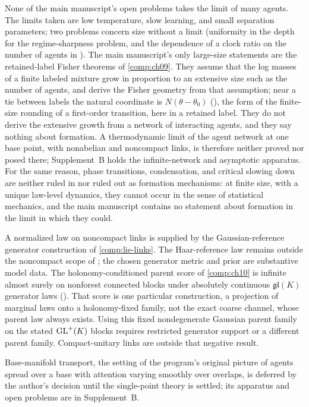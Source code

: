 None of the main manuscript's open problems takes the limit of many agents. The limits taken are low
temperature, slow learning, and small separation parameters; two problems concern size without a
limit (uniformity in the depth for the regime-sharpness problem, and the dependence of a clock ratio
on the number of agents in ). The main manuscript's only large-size
statements are the retained-label Fisher theorems of \cref{comp:ch09}. They assume that the log
masses of a finite labeled mixture grow in proportion to an extensive size such as the number of
agents, and derive the Fisher geometry from that assumption; near a tie between labels the natural
coordinate is $N(\theta-\theta_0)$ (), the form of the finite-size
rounding of a first-order transition, here in a retained label. They do not derive the extensive
growth from a network of interacting agents, and they say nothing about formation. A thermodynamic
limit of the agent network at one base point, with nonabelian and noncompact links, is therefore
neither proved nor posed there; Supplement~B holds the infinite-network and asymptotic apparatus.
For the same reason, phase transitions, condensation, and critical slowing down are neither ruled in
nor ruled out as formation mechanisms: at finite size, with a unique law-level dynamics, they cannot
occur in the sense of statistical mechanics, and the main manuscript contains no statement about
formation in the limit in which they could.

A normalized law on noncompact links is supplied by the Gaussian-reference generator construction
of \cref{comp:lie-links}. The Haar-reference law remains outside the noncompact scope of
; the chosen generator metric and prior are substantive model data. The
holonomy-conditioned parent score of \cref{comp:ch10} is infinite almost surely on nonforest
connected blocks under absolutely continuous $\mathfrak{gl}(K)$ generator laws
(). That score is one particular construction, a projection of
marginal laws onto a holonomy-fixed family, not the exact coarse channel, whose parent law always
exists. Using this fixed nondegenerate Gaussian parent family on the stated $\mathrm{GL}^+(K)$ blocks
requires restricted generator support or a different parent family. Compact-unitary links
are outside that negative result.

Base-manifold transport, the setting of the program's original picture of agents spread over a base
with attention varying smoothly over overlaps, is deferred by the author's decision until the
single-point theory is settled; its apparatus and open problems are in Supplement~B.
